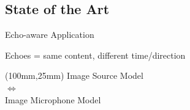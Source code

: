 \subsection{State of the Art}

\begin{frame}[t]{Echo-aware Application \hfill\faBook}

    \begin{block}{Echoes = same content, different time/direction}
        \centering
    \end{block}

    \begin{textblock*}{30mm}(100mm,25mm)
        \centering
        \small
        \textcolor{myred}{%
            Image Source Model
            \\$\Leftrightarrow$
            \\Image Microphone Model}
    \end{textblock*}


\end{frame}
